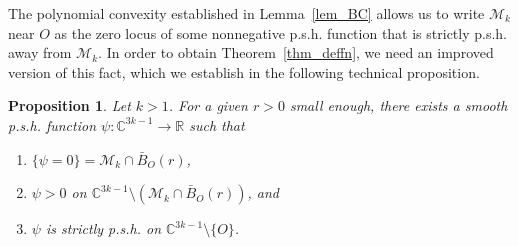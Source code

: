 \documentclass[10pt]{amsart}
\numberwithin{equation}{section}
\theoremstyle{definition}
\theoremstyle{definition}
\theoremstyle{plain}
\newtheorem{Prop}[theorem]{Proposition}
\newcommand{\bc}{\mathcal{M}}
\newcommand{\C} {\mathbb{C}}
\newcommand{\rl}{\mathbb{R}}
\begin{document}
The polynomial convexity established in Lemma~\ref{lem_BC} allows us to write $\bc_k$ near $O$ as the zero locus of some nonnegative p.s.h. function that is strictly p.s.h. away from $\bc_k$. In order to obtain Theorem~\ref{thm_deffn}, we need an improved version of this fact, which we establish in the following technical proposition.  
\begin{Prop}\label{prop_Slapar} Let $k>1$. For a given $r>0$ small enough, there exists a smooth p.s.h. function $\psi:\C^{3k-1}\rightarrow\rl$ such that 
\renewcommand{\theenumi}{\alph{enumi}}
	\begin{enumerate}
		\item $\{\psi=0\}=\bc_k\cap \bar B_O(r)$,
		\item $\psi>0$ on $\C^{3k-1}\setminus (\bc_k\cap \bar B_O(r))$, and
		\item $\psi$ is strictly p.s.h. on $\C^{3k-1}\setminus\{O\}$. 
	\end{enumerate}
\end{Prop}
\end{document}
